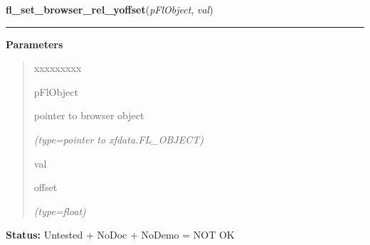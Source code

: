 \hspace{.8\funcindent}\begin{boxedminipage}{\funcwidth}

    \raggedright \textbf{fl\_set\_browser\_rel\_yoffset}(\textit{pFlObject}, \textit{val})

    \vspace{-1.5ex}

    \rule{\textwidth}{0.5\fboxrule}
\setlength{\parskip}{2ex}
\setlength{\parskip}{1ex}
      \textbf{Parameters}
      \vspace{-1ex}

      \begin{quote}
        \begin{Ventry}{xxxxxxxxx}

          \item[pFlObject]

          pointer to browser object

            {\it (type=pointer to xfdata.FL\_OBJECT)}

          \item[val]

          offset

            {\it (type=float)}

        \end{Ventry}

      \end{quote}

\textbf{Status:} Untested + NoDoc + NoDemo = NOT OK



    \end{boxedminipage}

    \label{xformslib:flbrowser:fl_set_browser_scrollbarsize}

    \vspace{0.5ex}

